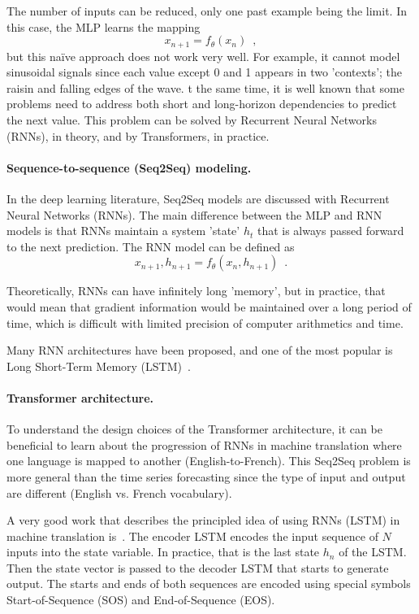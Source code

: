 \documentclass[final]{article}
\begin{document}
The number of inputs can be reduced, only one past example being the
limit. In this case, the MLP learns the mapping
\[
x_{n+1} = f_\theta (x_{n}) \enspace ,
\]
but this naïve approach does not work very well. For example, it
cannot model sinusoidal signals since each value except 0 and 1
appears in two ’contexts'; the raisin and falling edges of the wave.
t the same time, it is well known that some problems need to address
both short and long-horizon dependencies to predict the next value.
This problem can be solved by Recurrent Neural Networks (RNNs), in
theory, and by Transformers, in practice.


\paragraph{Sequence-to-sequence (Seq2Seq) modeling.}
In the deep learning literature, Seq2Seq models are discussed with
Recurrent Neural Networks (RNNs). The main difference between the MLP
and RNN models is that RNNs maintain a system 'state' $h_t$ that is
always passed forward to the next prediction. The RNN model can be
defined as
\[
x_{n+1},h_{n+1} = f_\theta (x_{n},h_{n+1}) \enspace .
\]

Theoretically, RNNs can have infinitely long 'memory', but in practice,
that would mean that gradient information would be maintained over a
long period of time, which is difficult with limited precision of
computer arithmetics and time. 

Many RNN architectures have been proposed, and one of the most popular
is Long Short-Term Memory (LSTM)~\cite{LSTM}.


\paragraph{Transformer architecture.}
To understand the design choices of the Transformer architecture, it
can be beneficial to learn about the progression of RNNs in machine
translation where one language is mapped to another
(English-to-French). This Seq2Seq problem is more general than the
time series forecasting since the type of input and output are
different (English vs. French vocabulary).


A very good work that describes the principled idea of using RNNs
(LSTM) in machine translation is~\cite{Sutskever-2014-neurips}.
The encoder LSTM encodes the input sequence of $N$ inputs into the state
variable. In practice, that is the last state $h_n$ of the LSTM. Then
the state vector is passed to the decoder LSTM that starts to generate
output. The starts and ends of both sequences are encoded using
special symbols Start-of-Sequence (SOS) and End-of-Sequence (EOS).
\end{document}
